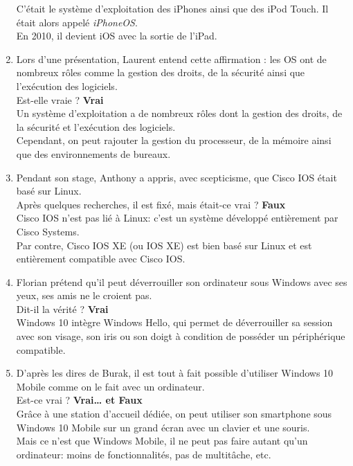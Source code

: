 \begin{enumerate}
  C'était le système d'exploitation des iPhones ainsi que des iPod Touch.
  Il était alors appelé \textit{iPhoneOS}. \\
  En 2010, il devient iOS avec la sortie de l'iPad. \\

  \item Lors d’une présentation, Laurent entend cette affirmation : les OS ont de
  nombreux rôles comme la gestion des droits, de la sécurité ainsi que
  l’exécution des logiciels. \\
  Est-elle vraie ? \textbf{Vrai} \\

  Un système d'exploitation a de nombreux rôles dont la gestion des droits, de
  la sécurité et l’exécution des logiciels. \\
  Cependant, on peut rajouter la gestion du processeur, de la mémoire ainsi que des
  environnements de bureaux. \\

  \item Pendant son stage, Anthony a appris, avec scepticisme, que Cisco IOS était
  basé sur Linux. \\
  Après quelques recherches, il est fixé, mais était-ce vrai ? \textbf{Faux} \\

  Cisco IOS n'est pas lié à Linux: c'est un système développé entièrement par
  Cisco Systems. \\
  Par contre, Cisco IOS XE (ou IOS XE) est bien basé sur Linux et est
  entièrement compatible avec Cisco IOS. \\

  \item Florian prétend qu’il peut déverrouiller son ordinateur sous Windows avec
  ses yeux, ses amis ne le croient pas. \\
  Dit-il la vérité ? \textbf{Vrai} \\

  Windows 10 intègre Windows Hello, qui permet de déverrouiller sa session avec
  son visage, son iris ou son doigt à condition de posséder un périphérique
  compatible. \\

  \item D’après les dires de Burak, il est tout à fait possible d’utiliser Windows
  10 Mobile comme on le fait avec un ordinateur. \\
  Est-ce vrai ? \textbf{Vrai… et Faux} \\

  Grâce à une station d'accueil dédiée, on peut utiliser son smartphone sous
  Windows 10 Mobile sur un grand écran avec un clavier et une souris. \\
  Mais ce n'est que Windows Mobile, il ne peut pas faire autant qu'un
  ordinateur: moins de fonctionnalités, pas de multitâche, etc.

\end{enumerate}
